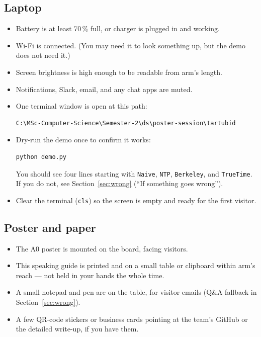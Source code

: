 \documentclass[a4paper,11pt]{article}
\begin{document}
\subsection*{Laptop}
\begin{itemize}[leftmargin=*,nosep]
  \item Battery is at least 70\,\% full, or charger is plugged in
        and working.
  \item Wi-Fi is connected. (You may need it to look something up,
        but the demo does not need it.)
  \item Screen brightness is high enough to be readable from arm's
        length.
  \item Notifications, Slack, email, and any chat apps are muted.
  \item One terminal window is open at this path:
\begin{verbatim}
C:\MSc-Computer-Science\Semester-2\ds\poster-session\tartubid
\end{verbatim}
  \item Dry-run the demo once to confirm it works:
\begin{verbatim}
python demo.py
\end{verbatim}
  You should see four lines starting with \texttt{Naive},
  \texttt{NTP}, \texttt{Berkeley}, and \texttt{TrueTime}. If you
  do not, see Section~\ref{sec:wrong} (``If something goes
  wrong'').
  \item Clear the terminal (\texttt{cls}) so the screen is empty
        and ready for the first visitor.
\end{itemize}

\subsection*{Poster and paper}
\begin{itemize}[leftmargin=*,nosep]
  \item The A0 poster is mounted on the board, facing visitors.
  \item This speaking guide is printed and on a small table or
        clipboard within arm's reach --- not held in your hands
        the whole time.
  \item A small notepad and pen are on the table, for visitor
        emails (Q\&A fallback in Section~\ref{sec:wrong}).
  \item A few QR-code stickers or business cards pointing at the
        team's GitHub or the detailed write-up, if you have them.
\end{itemize}
\end{document}
